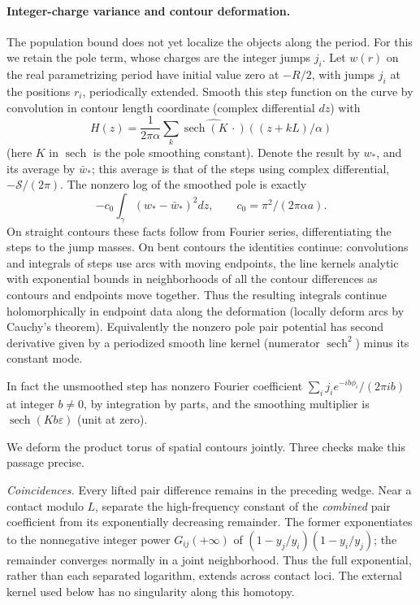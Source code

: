 \paragraph{Integer-charge variance and contour deformation.}
The population bound does not yet localize the objects along the period. For this we retain the pole term, whose charges are the integer jumps \(j_i\). Let \(w(r)\) on the real parametrizing period have initial value zero at \(-R/2\), with jumps \(j_i\) at the positions \(r_i\), periodically extended. Smooth this step function on the curve by convolution in contour length coordinate (complex differential \(dz\)) with
\[
 H(z)=\frac1{2\pi\alpha}\sum_k \widehat{\operatorname{sech}(K\,\cdot)}((z+kL)/\alpha)
\]
(here \(K\) in \(\operatorname{sech}\) is the pole smoothing constant). Denote the result by \(w_*\), and its average by \(\bar w_*\); this average is that of the steps using complex differential, \(-\mathcal S/(2\pi)\). The nonzero log of the smoothed pole is exactly
\[
 -c_0\int_\gamma(w_*-\bar w_*)^2 dz,\qquad c_0=\pi^2/(2\pi\alpha a).
\]
On straight contours these facts follow from Fourier series, differentiating the steps to the jump masses. On bent contours the identities continue: convolutions and integrals of steps use arcs with moving endpoints, the line kernels analytic with exponential bounds in neighborhoods of all the contour differences as contours and endpoints move together. Thus the resulting integrals continue holomorphically in endpoint data along the deformation (locally deform arcs by Cauchy's theorem). Equivalently the nonzero pole pair potential has second derivative given by a periodized smooth line kernel (numerator \(\operatorname{sech}^2\)) minus its constant mode.

In fact the unsmoothed step has nonzero Fourier coefficient \(\sum_i j_i e^{-i b\phi_i}/(2\pi i b)\) at integer \(b\ne0\), by integration by parts, and the smoothing multiplier is \(\operatorname{sech}(K b\varepsilon)\) (unit at zero).

We deform the product torus of spatial contours jointly. Three checks make this passage precise.

\emph{Coincidences.} Every lifted pair difference remains in the preceding wedge. Near a contact modulo $L$, separate the high-frequency constant of the \emph{combined} pair coefficient from its exponentially decreasing remainder. The former exponentiates to the nonnegative integer power $G_{ij}(+\infty)$ of $(1-y_j/y_i)(1-y_i/y_j)$; the remainder converges normally in a joint neighborhood. Thus the full exponential, rather than each separated logarithm, extends across contact loci. The external kernel used below has no singularity along this homotopy.

